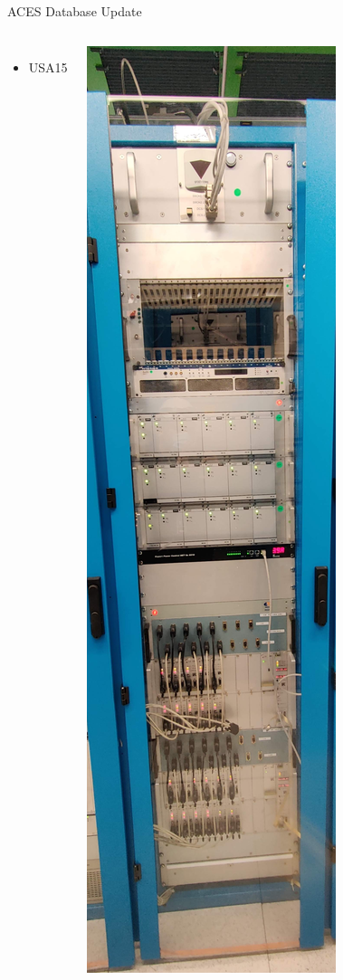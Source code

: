 \documentclass[aspectratio=169,xcolor=table]{beamer}
\begin{document}
\begin{frame}[t]{ACES Database Update}
\begin{columns}
          \begin{itemize}
          \item USA15
          \end{itemize}
          \includegraphics[height=.7\textheight,keepaspectratio=true]{Y.04-16.A1.jpeg}


\end{columns}
\end{frame}
\end{document}
